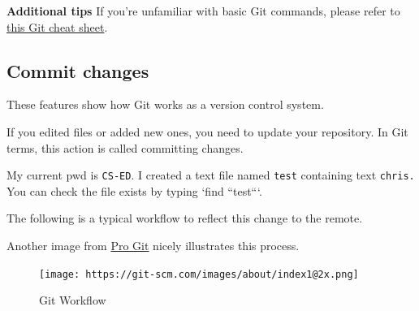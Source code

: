 \documentclass[
  letterpaper,
  DIV=11,
  numbers=noendperiod]{scrreprt}
\newenvironment{Shaded}{\begin{snugshade}}{\end{snugshade}}
\newcommand{\AttributeTok}[1]{\textcolor[rgb]{0.40,0.45,0.13}{#1}}
\newcommand{\CommentTok}[1]{\textcolor[rgb]{0.37,0.37,0.37}{#1}}
\newcommand{\ExtensionTok}[1]{\textcolor[rgb]{0.00,0.23,0.31}{#1}}
\newcommand{\NormalTok}[1]{\textcolor[rgb]{0.00,0.23,0.31}{#1}}
\newcommand{\StringTok}[1]{\textcolor[rgb]{0.13,0.47,0.30}{#1}}
\begin{document}
\textbf{Additional tips} If you're unfamiliar with basic Git commands,
please refer to
\href{http://rogerdudler.GitHub.io/git-guide/files/git_cheat_sheet.pdf}{this
Git cheat sheet}.

\hypertarget{commit-changes}{%
\subsection*{Commit changes}\label{commit-changes}}

These features show how Git works as a version control system.

If you edited files or added new ones, you need to update your
repository. In Git terms, this action is called committing changes.

My current pwd is \texttt{CS-ED}. I created a text file named
\texttt{test} containing text \texttt{chris.} You can check the file
exists by typing `find ``test```.

The following is a typical workflow to reflect this change to the
remote.

\begin{Shaded}
\end{Shaded}

Another image from \href{https://git-scm.com/about/staging-area}{Pro
Git} nicely illustrates this process.

\begin{figure}

{\centering \texttt{[image: https://git-scm.com/images/about/index1@2x.png]}

}

\caption{Git Workflow}

\end{figure}
\end{document}
